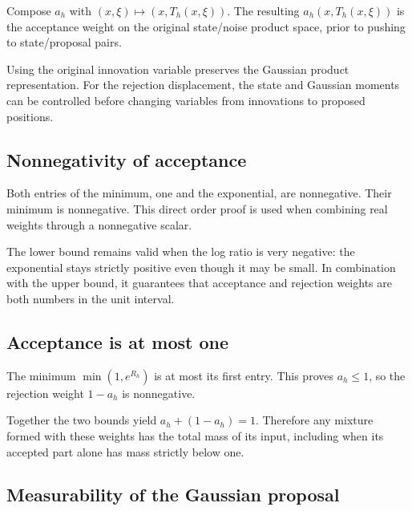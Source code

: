 \documentclass[11pt,a4paper]{report}
\begin{document}
Compose \(a_h\) with \((x,\xi)\mapsto(x,T_h(x,\xi))\). The resulting \(a_h(x,T_h(x,\xi))\) is the acceptance weight on the original state/\allowbreak{}noise product space, prior to pushing to state/\allowbreak{}proposal pairs.



Using the original innovation variable preserves the Gaussian product representation. For the rejection displacement, the state and Gaussian moments can be controlled before changing variables from innovations to proposed positions.

\subsection{\texorpdfstring{Nonnegativity of acceptance}{Nonnegativity of acceptance}}
\label{report-step-UnadjustedLangevin-MALACoupling-lean-3}


Both entries of the minimum, one and the exponential, are nonnegative. Their minimum is nonnegative. This direct order proof is used when combining real weights through a nonnegative scalar.



The lower bound remains valid when the log ratio is very negative: the exponential stays strictly positive even though it may be small. In combination with the upper bound, it guarantees that acceptance and rejection weights are both numbers in the unit interval.

\subsection{\texorpdfstring{Acceptance is at most one}{Acceptance is at most one}}
\label{report-step-UnadjustedLangevin-MALACoupling-lean-4}


The minimum \(\min(1,e^{R_h})\) is at most its first entry. This proves \(a_h\le1\), so the rejection weight \(1-a_h\) is nonnegative.



Together the two bounds yield \(a_h+(1-a_h)=1\). Therefore any mixture formed with these weights has the total mass of its input, including when its accepted part alone has mass strictly below one.

\subsection{\texorpdfstring{Measurability of the Gaussian proposal}{Measurability of the Gaussian proposal}}
\label{report-step-UnadjustedLangevin-MALACoupling-lean-5}
\end{document}
